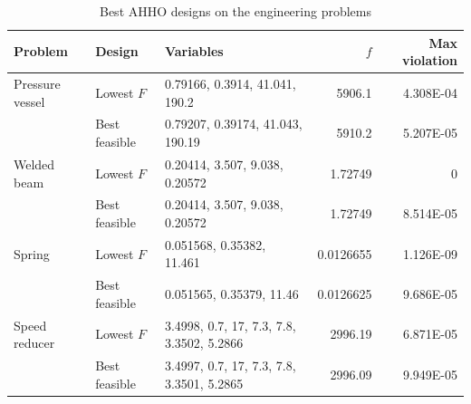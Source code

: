 \begin{table}[htbp]
\caption{Best AHHO designs on the engineering problems}\label{tab:eng-design}
\centering
\small
\begin{tabularx}{\textwidth}{l l X r r}
\toprule
Problem & Design & Variables & $f$ & Max violation \\
\midrule
Pressure vessel & Lowest $F$ & 0.79166, 0.3914, 41.041, 190.2 & 5906.1 & 4.308E-04 \\
 & Best feasible & 0.79207, 0.39174, 41.043, 190.19 & 5910.2 & 5.207E-05 \\
Welded beam & Lowest $F$ & 0.20414, 3.507, 9.038, 0.20572 & 1.72749 & 0 \\
 & Best feasible & 0.20414, 3.507, 9.038, 0.20572 & 1.72749 & 8.514E-05 \\
Spring & Lowest $F$ & 0.051568, 0.35382, 11.461 & 0.0126655 & 1.126E-09 \\
 & Best feasible & 0.051565, 0.35379, 11.46 & 0.0126625 & 9.686E-05 \\
Speed reducer & Lowest $F$ & 3.4998, 0.7, 17, 7.3, 7.8, 3.3502, 5.2866 & 2996.19 & 6.871E-05 \\
 & Best feasible & 3.4997, 0.7, 17, 7.3, 7.8, 3.3501, 5.2865 & 2996.09 & 9.949E-05 \\
\bottomrule
\end{tabularx}
\end{table}
